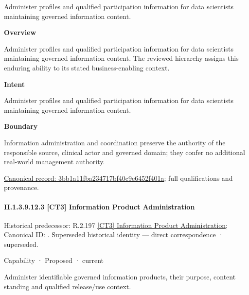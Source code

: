 Administer profiles and qualified participation information for data scientists maintaining governed information content.



\textbf{Overview}



Administer profiles and qualified participation information for data scientists maintaining governed information content. The reviewed hierarchy assigns this enduring ability to its stated business-enabling context.



\textbf{Intent}



Administer profiles and qualified participation information for data scientists maintaining governed information content.



\textbf{Boundary}



Information administration and coordination preserve the authority of the responsible source, clinical actor and governed domain; they confer no additional real-world management authority.


{\footnotesize \href{../../../../../../../continuum/strategy/capability/3bb1a11fba234717bf40c9e6452f401a.md}{Canonical record: 3bb1a11fba234717bf40c9e6452f401a}; full qualifications and provenance.}\par
\paragraph*{II.1.3.9.12.3 [CT3] Information Product Administration}
\label{navigation:II.1.3.9.12.3}

{\small Historical predecessor: R.2.197 \hyperref[element:5d9b7f8d2d7b41759b6d4931c1d2aaa2]{[CT3] Information Product Administration}; Canonical ID: \texttt{}. Superseded historical identity — direct correspondence · superseded.}\par
\label{element:b5a6a31855834ea58870ebb6c51ed4b0}
{\small Capability · Proposed · current}\par

Administer identifiable governed information products, their purpose, content standing and qualified release/use context.



